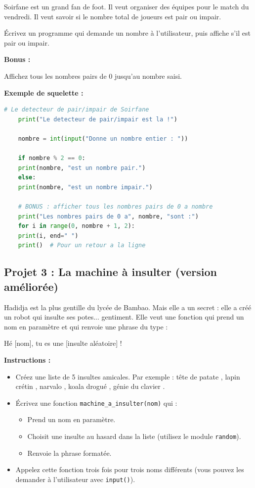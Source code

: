 \documentclass[12pt,a4paper]{article}
\begin{document}
Soirfane est un grand fan de foot. Il veut organiser des équipes pour le match du vendredi. Il veut savoir si le nombre total de joueurs est pair ou impair.

Écrivez un programme qui demande un nombre à l'utilisateur, puis affiche s'il est pair ou impair.

\begin{flushleft}
	\textbf{Bonus :}
\end{flushleft}
Affichez tous les nombres pairs de 0 jusqu'au nombre saisi.

\textbf{Exemple de squelette :}

\begin{lstlisting}[language=Python]
	# Le detecteur de pair/impair de Soirfane
	print("Le detecteur de pair/impair est la !")
	
	nombre = int(input("Donne un nombre entier : "))
	
	if nombre % 2 == 0:
	print(nombre, "est un nombre pair.")
	else:
	print(nombre, "est un nombre impair.")
	
	# BONUS : afficher tous les nombres pairs de 0 a nombre
	print("Les nombres pairs de 0 a", nombre, "sont :")
	for i in range(0, nombre + 1, 2):
	print(i, end=" ")
	print()  # Pour un retour a la ligne
\end{lstlisting}

\subsection*{Projet 3 : La machine à insulter (version améliorée)}

Hadidja est la plus gentille du lycée de Bambao. Mais elle a un secret : elle a créé un robot qui insulte ses potes... gentiment. Elle veut une fonction qui prend un nom en paramètre et qui renvoie une phrase du type :

\og Hé [nom], tu es une [insulte aléatoire] ! \fg

\begin{flushleft}
	\textbf{Instructions :}
\end{flushleft}
\begin{itemize}
	\item [\ding{182}] Créez une liste de 5 insultes amicales. Par exemple : \og tête de patate \fg, \og lapin crétin \fg, \og narvalo \fg, \og koala drogué \fg, \og génie du clavier \fg.
	\item [\ding{183}] Écrivez une fonction \texttt{machine\_a\_insulter(nom)} qui :
	\begin{itemize}
		\item Prend un nom en paramètre.
		\item Choisit une insulte au hasard dans la liste (utilisez le module \texttt{random}).
		\item Renvoie la phrase formatée.
	\end{itemize}
	\item [\ding{184}] Appelez cette fonction trois fois pour trois noms différents (vous pouvez les demander à l'utilisateur avec \texttt{input()}).
\end{itemize}
\end{document}
